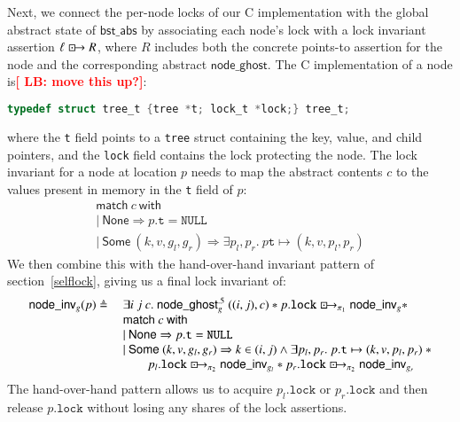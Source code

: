 \documentclass[runningheads]{llncs}
\newcommand{\LB}[1]{\textbf{\textcolor{red}{[ LB: #1]}}}
\newcommand{\islock}{\boxdotright}
\newcommand{\treerep}{\ensuremath{\mathsf{bst\_abs}}}
\newcommand{\myhalf}[2]{\ensuremath{\mathsf{node\_ghost}^{.5}_{#1}\ (#2)}}
\begin{document}
Next, we connect the per-node locks of our C implementation with the global abstract state of $\treerep$ by associating each node's lock with a lock invariant assertion $\ell \islock R$, where $R$ includes both the concrete points-to assertion for the node and the corresponding abstract $\mathsf{node\_ghost}$. The C implementation of a node is\LB{move this up?}:
\begin{lstlisting}[language = C,numbers = none]
typedef struct tree_t {tree *t; lock_t *lock;} tree_t;
\end{lstlisting}
where the \lstinline{t} field points to a \lstinline{tree} struct containing the key, value, and child pointers, and the \lstinline{lock} field contains the lock protecting the node. The lock invariant for a node at location $p$ needs to map the abstract contents $c$ to the values present in memory in the \lstinline{t} field of $p$:
$$\begin{array}{l}
\mathsf{match}\ c\ \mathsf{with}\\
|\ \mathsf{None} \Rightarrow p.\texttt{t} = \texttt{NULL}\\
|\ \mathsf{Some}\ (k, v, g_l, g_r) \Rightarrow \exists p_l, p_r.\ p\texttt{t} \mapsto (k, v, p_l, p_r)
\end{array}$$
We then combine this with the hand-over-hand invariant pattern of section~\ref{selflock}, giving us a final lock invariant of:
$$\begin{array}{r l}
\mathsf{node\_inv}_g(p) \triangleq \ &\exists i\ j\ c.\ \myhalf{g}{(i, j), c} * p.\texttt{lock} \islock_{\pi_1} \mathsf{node\_inv}_g * \\&\mathsf{match}\ c\ \mathsf{with}\\
&|\ \mathsf{None} \Rightarrow p.\texttt{t} = \texttt{NULL}\\
&|\ \mathsf{Some}\ (k, v, g_l, g_r) \Rightarrow k \in (i, j) \land \exists p_l, p_r.\ p.\texttt{t} \mapsto (k, v, p_l, p_r)\ * \\&\qquad p_l.\texttt{lock} \islock_{\pi_2} \mathsf{node\_inv}_{g_l} * p_r.\texttt{lock} \islock_{\pi_2} \mathsf{node\_inv}_{g_r}
\end{array}$$
The hand-over-hand pattern allows us to acquire $p_l.\texttt{lock}$ or $p_r.\texttt{lock}$ and then release $p.\texttt{lock}$ without losing any shares of the lock assertions.
\end{document}

